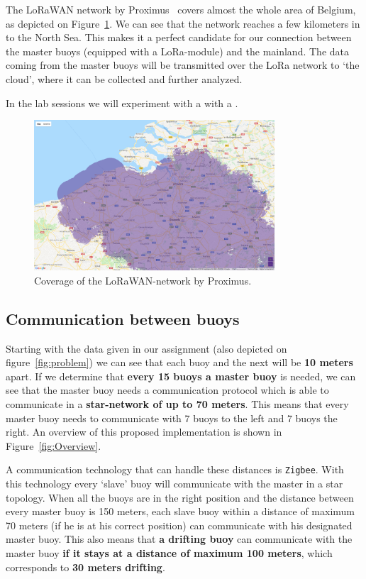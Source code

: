 \documentclass[11pt,a4paper,twoside]{article} %
\begin{document}
The LoRaWAN network by Proximus~\cite{LORAWAN} covers almost the whole area of Belgium, as depicted on Figure~\ref{fig:Coverage}. We can see that the network reaches a few kilometers in to the North Sea. This makes it a perfect candidate for our connection between the master buoys (equipped with a LoRa-module) and the mainland. The data coming from the master buoys will be transmitted over the LoRa network to `the cloud', where it can be collected and further analyzed.

In the lab sessions we will experiment with a  with a .

\begin{figure}[H]
    \centering
    \includegraphics[width=0.8\textwidth]{LoraDekking.png}
    \caption{Coverage of the LoRaWAN-network by Proximus.}
    \label{fig:Coverage}
\end{figure}

\clearpage


\subsection{Communication between buoys}

Starting with the data given in our assignment (also depicted on figure~\ref{fig:problem}) we can see that each buoy and the next will be \textbf{10 meters} apart. If we determine that \textbf{every 15 buoys a master buoy} is needed, we can see that the master buoy needs a communication protocol which is able to communicate in a \textbf{star-network of up to 70 meters}. This means that every master buoy needs to communicate with 7 buoys to the left and 7 buoys the right. An overview of this proposed implementation is shown in Figure~\ref{fig:Overview}.

A communication technology that can handle these distances is \texttt{Zigbee}. With this technology every `slave' buoy will communicate with the master in a star topology. When all the buoys are in the right position and the distance between every master buoy is 150 meters, each slave buoy within a distance of maximum 70 meters (if he is at his correct position) can communicate with his designated master buoy. This also means that \textbf{a drifting buoy} can communicate with the master buoy \textbf{if it stays at a distance of maximum 100 meters}, which corresponds to \textbf{30 meters drifting}.
\end{document}
